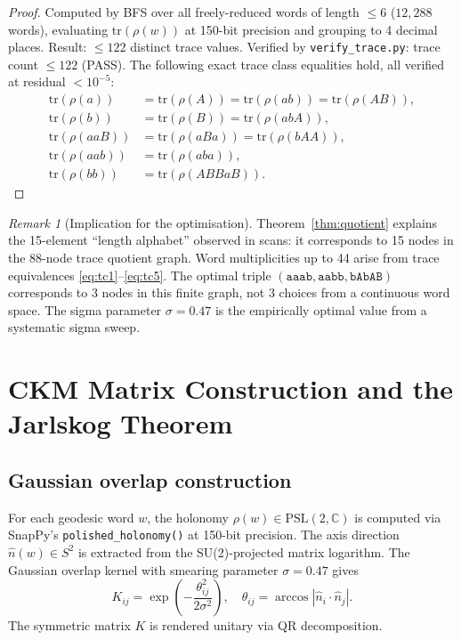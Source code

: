 \documentclass[11pt,a4paper]{article}
\theoremstyle{remark}
\newtheorem{remark}[theorem]{Remark}
\newcommand{\CC}{\mathbb{C}}
\newcommand{\PSL}{\mathrm{PSL}(2,\CC)}
\begin{document}
\begin{proof}
Computed by BFS over all freely-reduced words of length $\leq 6$
($12{,}288$ words), evaluating $\mathrm{tr}(\rho(w))$ at 150-bit
precision and grouping to 4 decimal places.
Result: $\leq 122$ distinct trace values.
Verified by \texttt{verify\_trace.py}: trace count $\leq 122$ (PASS).
The following exact trace class equalities hold, all verified at
residual $< 10^{-5}$:
\begin{align}
\mathrm{tr}(\rho(a)) &= \mathrm{tr}(\rho(A)) = \mathrm{tr}(\rho(ab))
  = \mathrm{tr}(\rho(AB)), \label{eq:tc1} \\
\mathrm{tr}(\rho(b)) &= \mathrm{tr}(\rho(B)) = \mathrm{tr}(\rho(abA)), \label{eq:tc2} \\
\mathrm{tr}(\rho(aaB)) &= \mathrm{tr}(\rho(aBa)) = \mathrm{tr}(\rho(bAA)), \label{eq:tc3} \\
\mathrm{tr}(\rho(aab)) &= \mathrm{tr}(\rho(aba)), \label{eq:tc4} \\
\mathrm{tr}(\rho(bb)) &= \mathrm{tr}(\rho(ABBaB)). \label{eq:tc5}
\end{align}
\end{proof}

\begin{remark}[Implication for the optimisation]
Theorem~\ref{thm:quotient} explains the 15-element ``length alphabet''
observed in scans: it corresponds to 15 nodes in the 88-node trace
quotient graph.
Word multiplicities up to 44 arise from trace equivalences
\eqref{eq:tc1}--\eqref{eq:tc5}.
The optimal triple $(\mathtt{aaab}, \mathtt{aabb}, \mathtt{bAbAB})$
corresponds to 3 nodes in this finite graph, not 3 choices from a
continuous word space.
The sigma parameter $\sigma = 0.47$ is the empirically optimal value
from a systematic sigma sweep.
\end{remark}

\section{CKM Matrix Construction and the Jarlskog Theorem}
\label{sec:ckm}

\subsection{Gaussian overlap construction}

For each geodesic word $w$, the holonomy $\rho(w) \in \PSL$ is
computed via SnapPy's \texttt{polished\_holonomy()} at 150-bit
precision.
The axis direction $\hat{n}(w) \in S^2$ is extracted from the
SU(2)-projected matrix logarithm.
The Gaussian overlap kernel with smearing parameter $\sigma = 0.47$ gives
\[
K_{ij} = \exp\!\left(-\frac{\theta_{ij}^2}{2\sigma^2}\right),
\quad
\theta_{ij} = \arccos|\hat{n}_i \cdot \hat{n}_j|.
\]
The symmetric matrix $K$ is rendered unitary via QR decomposition.
\end{document}
